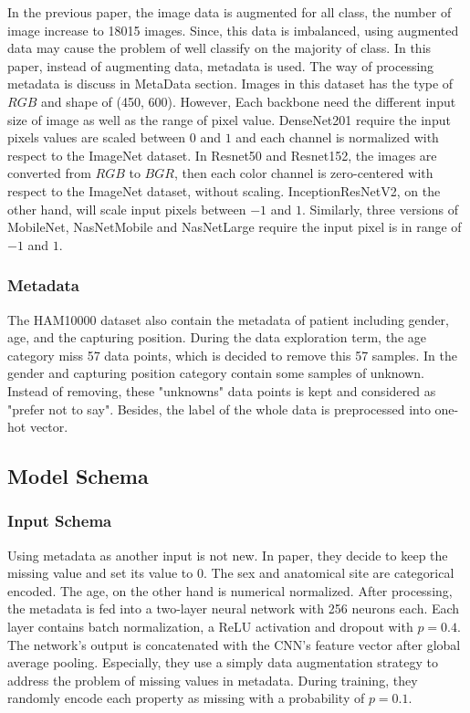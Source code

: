 \documentclass[sensors,article,submit,pdftex,moreauthors]{Definitions/mdpi}
\begin{document}
In the previous paper\cite{03358}, the image data is augmented for all class, the number of image increase to 18015 images. Since, this data is imbalanced, using augmented data may cause the problem of well classify on the majority of class. In this paper, instead of augmenting data, metadata is used. The way of processing metadata is discuss in MetaData section. Images in this dataset has the type of $RGB$ and shape of (450, 600). However, Each backbone need the different input size of image as well as the range of pixel value. DenseNet201\cite{06993} require the input pixels values are scaled between $0$ and $1$ and each channel is normalized with respect to the ImageNet dataset. In Resnet50 and Resnet152\cite{03385}\cite{05027}, the images are converted from $RGB$ to $BGR$, then each color channel is zero-centered with respect to the ImageNet dataset, without scaling. InceptionResNetV2\cite{11946}, on the other hand, will scale input pixels between $-1$ and $1$. Similarly, three versions of MobileNet\cite{04861}\cite{04381}\cite{02244}, NasNetMobile and NasNetLarge\cite{07012} require the input pixel is in range of $-1$ and $1$. 
\subsubsection{Metadata}
The HAM10000 dataset\cite{10417} also contain the metadata of patient including gender, age, and the capturing position. During the data exploration term, the age category miss 57 data points, which is decided to remove this 57 samples. In the gender and capturing position category contain some samples of unknown. Instead of removing, these "unknowns" data points is kept and considered as "prefer not to say". Besides, the label of the whole data is preprocessed into one-hot vector.
\subsection{Model Schema}
\subsubsection{Input Schema}
Using metadata as another input is not new. In paper\cite{03910}, they decide to keep the missing value and set its value to $0$. The sex and anatomical site are categorical encoded. The age, on the other hand is numerical normalized. After processing, the metadata is fed into a two-layer neural network with 256 neurons each. Each layer contains batch normalization, a ReLU\cite{08375} activation and dropout with $p = 0.4$. The network’s output is concatenated with the CNN’s feature vector after global average pooling. Especially, they use a simply data augmentation strategy to address the problem of missing values in metadata. During training, they randomly encode each property as missing with a probability of $p = 0.1$. 
\end{document}
